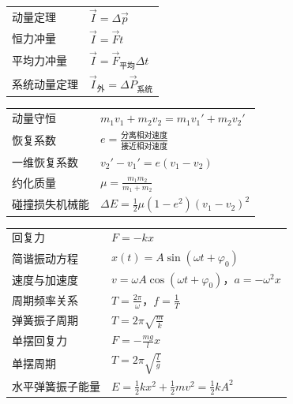 \begin{tabularx}{\columnwidth}{XX}
  动量定理 & $\vec I=\Delta\vec p$ \\
  恒力冲量 & $\vec I=\vec F t$ \\
  平均力冲量 & $\vec I=\vec F_{\text{平均}}\Delta t$ \\
  系统动量定理 & $\vec I_{\text{外}}=\Delta\vec P_{\text{系统}}$ \\
\end{tabularx}
\medskip

\begin{tabularx}{\columnwidth}{XX}
  动量守恒 & $m_1v_1+m_2v_2=m_1v_1'+m_2v_2'$ \\
  恢复系数 & $e=\frac{\text{分离相对速度}}{\text{接近相对速度}}$ \\
  一维恢复系数 & $v_2'-v_1'=e(v_1-v_2)$ \\
  约化质量 & $\mu=\frac{m_1m_2}{m_1+m_2}$ \\
  碰撞损失机械能 & $\Delta E=\frac12\mu(1-e^2)(v_1-v_2)^2$ \\
\end{tabularx}
\medskip

\begin{tabularx}{\columnwidth}{XX}
  回复力 & $F=-kx$ \\
  简谐振动方程 & $x(t)=A\sin(\omega t+\varphi_0)$ \\
  速度与加速度 & $v=\omega A\cos(\omega t+\varphi_0)$，$a=-\omega^2x$ \\
  周期频率关系 & $T=\frac{2\pi}{\omega}$，$f=\frac{1}{T}$ \\
  弹簧振子周期 & $T=2\pi\sqrt{\frac{m}{k}}$ \\
  单摆回复力 & $F=-\frac{mg}{l}x$ \\
  单摆周期 & $T=2\pi\sqrt{\frac{l}{g}}$ \\
  水平弹簧振子能量 & $E=\frac{1}{2}kx^2+\frac{1}{2}mv^2=\frac12kA^2$ \\
\end{tabularx}
\medskip

